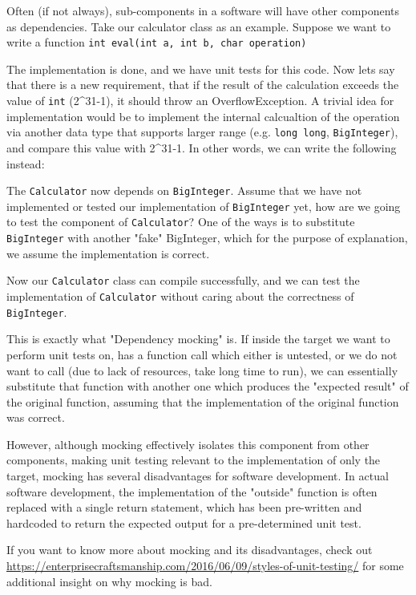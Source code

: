 Often (if not always), sub-components in a software will have other components as dependencies. Take our calculator class as an example. Suppose we want to write a function \texttt{int eval(int a, int b, char operation)}


The implementation is done, and we have unit tests for this code. Now lets say that there is a new requirement, that if the result of the calculation exceeds the value of \texttt{int} (2^{31}-1), it should throw an OverflowException. A trivial idea for implementation would be to implement the internal calcualtion of the operation via another data type that supports larger range (e.g. \texttt{long long}, \texttt{BigInteger}), and compare this value with 2^{31}-1. In other words, we can write the following instead:


The \texttt{Calculator} now depends on \texttt{BigInteger}. Assume that we have not implemented or tested our implementation of \texttt{BigInteger} yet, how are we going to test the component of \texttt{Calculator}? One of the ways is to substitute \texttt{BigInteger} with another "fake" BigInteger, which for the purpose of explanation, we assume the implementation is correct.


Now our \texttt{Calculator} class can compile successfully, and we can test the implementation of \texttt{Calculator} without caring about the correctness of \texttt{BigInteger}. 

This is exactly what "Dependency mocking" is. If inside the target we want to perform unit tests on, has a function call which either is untested, or we do not want to call (due to lack of resources, take long time to run), we can essentially substitute that function with another one which produces the "expected result" of the original function, assuming that the implementation of the original function was correct. 

However, although mocking effectively isolates this component from other components, making unit testing relevant to the implementation of only the target, mocking has several disadvantages for software development. In actual software development, the implementation of the "outside" function is often replaced with a single return statement, which has been pre-written and hardcoded to return the expected output for a pre-determined unit test. 

If you want to know more about mocking and its disadvantages, check out \url{https://enterprisecraftsmanship.com/2016/06/09/styles-of-unit-testing/} for some additional insight on why mocking is bad. 
